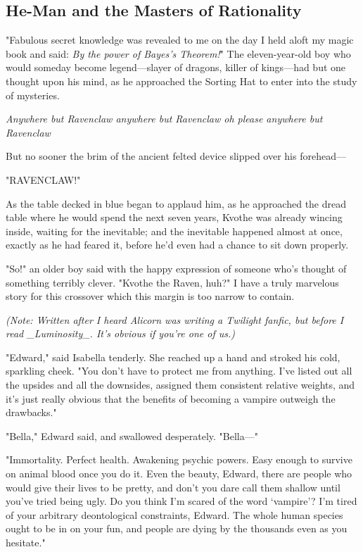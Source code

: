 \subsection{He-Man and the Masters of Rationality}

"Fabulous secret knowledge was revealed to me on the day I held aloft my magic
book and said: \emph{By the power of Bayes's Theorem!}"
\sbreak
The eleven-year-old boy who would someday become legend—slayer of dragons,
killer of kings—had but one thought upon his mind, as he approached the
Sorting Hat to enter into the study of mysteries.

\emph{Anywhere but Ravenclaw anywhere but Ravenclaw oh please anywhere but
Ravenclaw{\el}}

But no sooner the brim of the ancient felted device slipped over his forehead—

"RAVENCLAW!"

As the table decked in blue began to applaud him, as he approached the dread
table where he would spend the next seven years, Kvothe was already wincing
inside, waiting for the inevitable; and the inevitable happened almost at once,
exactly as he had feared it, before he'd even had a chance to sit down properly.

"So!" an older boy said with the happy expression of someone who's thought of
something terribly clever. "Kvothe the Raven, huh?"
\sbreak
I have a truly marvelous story for this crossover which this margin is too
narrow to contain.
\sbreak

\emph{(Note: Written after I heard Alicorn was writing a Twilight fanfic, but
before I read \_Luminosity\_. It's obvious if you're one of us.)}

\noindent{}"Edward," said Isabella tenderly. She reached up a hand and stroked his cold,
sparkling cheek. "You don't have to protect me from anything. I've listed out
all the upsides and all the downsides, assigned them consistent relative
weights, and it's just really obvious that the benefits of becoming a vampire
outweigh the drawbacks."

"Bella," Edward said, and swallowed desperately. "Bella—"

"Immortality. Perfect health. Awakening psychic powers. Easy enough to survive
on animal blood once you do it. Even the beauty, Edward, there are people who
would give their lives to be pretty, and don't you dare call them shallow until
you've tried being ugly. Do you think I'm scared of the word `vampire'? I'm
tired of your arbitrary deontological constraints, Edward. The whole human
species ought to be in on your fun, and people are dying by the thousands even
as you hesitate."

